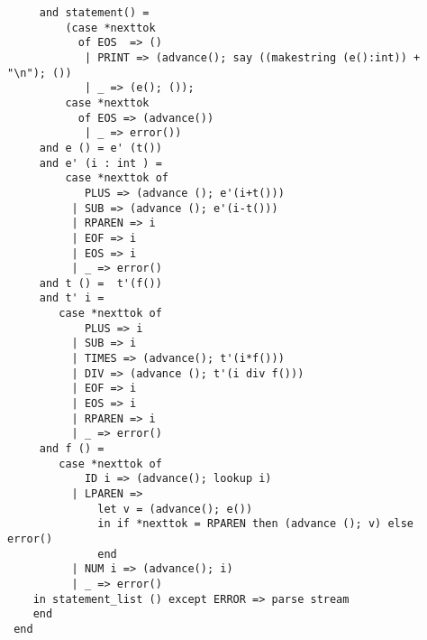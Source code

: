 \begin{verbatim}
     and statement() =
         (case *nexttok
           of EOS  => ()
            | PRINT => (advance(); say ((makestring (e():int)) + "\n"); ())
            | _ => (e(); ());
         case *nexttok
           of EOS => (advance())
            | _ => error())
     and e () = e' (t())
     and e' (i : int ) =
         case *nexttok of
            PLUS => (advance (); e'(i+t()))
          | SUB => (advance (); e'(i-t()))
          | RPAREN => i
          | EOF => i
          | EOS => i
          | _ => error()
     and t () =  t'(f())
     and t' i =
        case *nexttok of
            PLUS => i
          | SUB => i
          | TIMES => (advance(); t'(i*f()))
          | DIV => (advance (); t'(i div f()))
          | EOF => i
          | EOS => i
          | RPAREN => i
          | _ => error()
     and f () =
        case *nexttok of
            ID i => (advance(); lookup i)
          | LPAREN =>
              let v = (advance(); e())
              in if *nexttok = RPAREN then (advance (); v) else error()
              end
          | NUM i => (advance(); i)
          | _ => error()
    in statement_list () except ERROR => parse stream
    end
 end
\end{verbatim}

